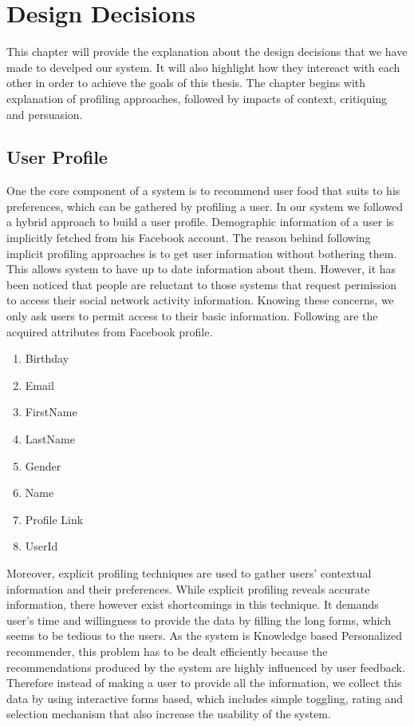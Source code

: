 
\chapter{Design Decisions}

This chapter will provide the explanation about the design decisions that we have made to develped our system. It will also highlight how they intereact with each other in order to achieve the goals of this thesis. The chapter begins with explanation of profiling approaches, followed by impacts of context, critiquing and persuasion.

\section{User Profile}

One the core component of a system is to recommend user food that suits to his preferences, which can be gathered by profiling a user. In our system we followed a hybrid approach to build a user profile. Demographic information of a user is implicitly fetched from his Facebook account. The reason behind following implicit profiling approaches is to get user information without bothering them. This allows system to have up to date information about them.  However, it has been noticed that people are reluctant to those systems that request permission to access their social network activity information. Knowing these concerns, we only ask users to permit access to their basic information. Following are the acquired attributes from Facebook profile.

\begin{enumerate}
	\item Birthday
	\item Email	
	\item FirstName
	\item LastName
	\item Gender
	\item Name
	\item Profile Link
	\item UserId
\end{enumerate}

Moreover, explicit profiling techniques are used to gather users' contextual information and their preferences. While explicit profiling reveals accurate information, there however exist shortcomings in this technique. It demands user’s time and willingness to provide the data by filling the long forms, which seems to be tedious to the users. As the system is Knowledge based Personalized recommender, this problem has to be dealt efficiently because the recommendations produced by the system are highly influenced by user feedback. Therefore instead of making a user to provide all the information, we collect this data by using interactive forms based, which includes simple toggling, rating and selection mechanism that also increase the usability of the system.

